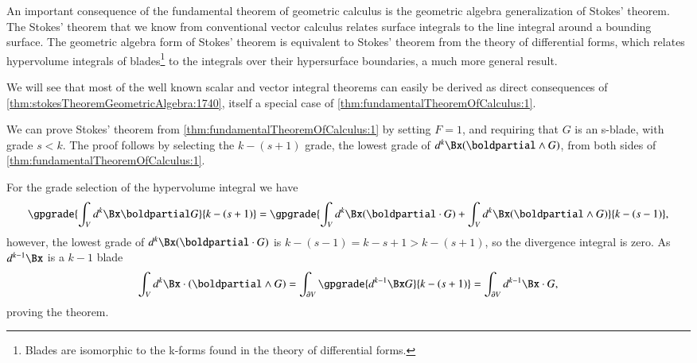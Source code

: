 %
%
An important consequence of the fundamental theorem of geometric calculus is the
geometric algebra generalization of Stokes' theorem.
The Stokes' theorem that we know from conventional vector calculus relates
 surface integrals to the line integral around a bounding surface.
The geometric algebra form of Stokes' theorem is equivalent to Stokes' theorem from the theory of differential forms, which relates
hypervolume integrals of blades\footnote{Blades are isomorphic to the k-forms found in the theory of differential forms.} to the integrals over their hypersurface boundaries, a much more general result.


We will see that most of the well known scalar and vector integral theorems can easily be derived as direct consequences of \cref{thm:stokesTheoremGeometricAlgebra:1740}, itself a special case of \cref{thm:fundamentalTheoremOfCalculus:1}.

We can prove Stokes' theorem
from \cref{thm:fundamentalTheoremOfCalculus:1}
by setting \( F = 1 \), and requiring that \( G \)
is an s-blade, with grade \( s < k \).
The proof follows by selecting the \( k-(s+1) \) grade, the lowest grade of \( d^k \Bx (\boldpartial \wedge G) \), from both sides of \cref{thm:fundamentalTheoremOfCalculus:1}.

For the grade selection of the hypervolume integral we have
\begin{dmath}\label{eqn:stokesTheoremTheStatement:100}
\gpgrade{ \int_V d^k \Bx \boldpartial G }{k-(s+1)}
=
\gpgrade{
\int_V d^k \Bx (\boldpartial \cdot G )
+
\int_V d^k \Bx (\boldpartial \wedge G )
}{k-(s-1)},
\end{dmath}
however, the lowest grade of \( d^k \Bx (\boldpartial \cdot G ) \) is \( k -(s-1) = k - s + 1 > k - (s+1) \), so the divergence integral is zero.  As \( d^{k-1} \Bx \) is a \( k - 1 \) blade
\begin{dmath}\label{eqn:stokesTheoremTheStatement:110}
\int_V d^k \Bx \cdot (\boldpartial \wedge G )
= \int_{\partial V} \gpgrade{d^{k-1} \Bx G}{k-(s+1)}
= \int_{\partial V} d^{k-1} \Bx \cdot G,
\end{dmath}
proving the theorem.
